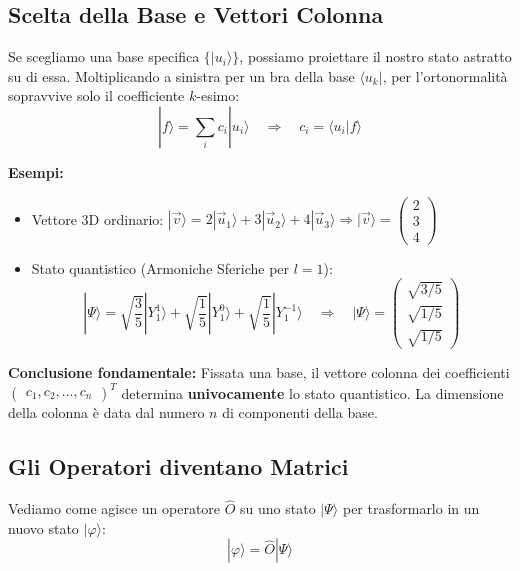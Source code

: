 \documentclass[11pt, a4paper]{article}
\begin{document}
\subsection{Scelta della Base e Vettori Colonna} %

Se scegliamo una base specifica $\{|u_i\rangle\}$, possiamo proiettare il nostro stato astratto su di essa. Moltiplicando a sinistra per un bra della base $\langle u_k|$, per l'ortonormalità sopravvive solo il coefficiente $k$-esimo: %
\begin{equation}
    |f\rangle = \sum_i c_i |u_i\rangle \quad \Rightarrow \quad \boxed{ c_i = \langle u_i|f\rangle } %
\end{equation}

\textbf{Esempi:} %
\begin{itemize}
    \item Vettore 3D ordinario: $|\vec{v}\rangle = 2|\vec{u}_1\rangle + 3|\vec{u}_2\rangle + 4|\vec{u}_3\rangle \Rightarrow |\vec{v}\rangle = \begin{pmatrix} 2 \\ 3 \\ 4 \end{pmatrix}$ %
    \item Stato quantistico (Armoniche Sferiche per $l=1$): %
    \begin{equation*}
        |\Psi\rangle = \sqrt{\frac{3}{5}} |Y_1^1\rangle + \sqrt{\frac{1}{5}} |Y_1^0\rangle + \sqrt{\frac{1}{5}} |Y_1^{-1}\rangle \quad \Rightarrow \quad |\Psi\rangle = \begin{pmatrix} \sqrt{3/5} \\ \sqrt{1/5} \\ \sqrt{1/5} \end{pmatrix} %
    \end{equation*}
\end{itemize}

\noindent
\textbf{Conclusione fondamentale:} Fissata una base, il vettore colonna dei coefficienti $\begin{pmatrix} c_1, c_2, \dots, c_n \end{pmatrix}^T$ determina \textbf{univocamente} lo stato quantistico. La dimensione della colonna è data dal numero $n$ di componenti della base. %

\subsection{Gli Operatori diventano Matrici} %

Vediamo come agisce un operatore $\hat{O}$ su uno stato $|\Psi\rangle$ per trasformarlo in un nuovo stato $|\varphi\rangle$: %
\begin{equation*}
    |\varphi\rangle = \hat{O}|\Psi\rangle %
\end{equation*}
\end{document}

